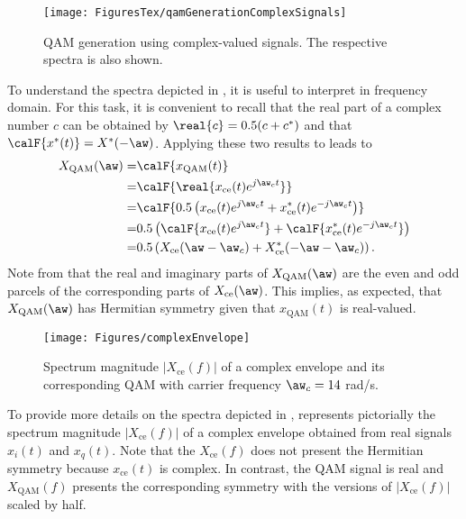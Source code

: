 \begin{figure}[htbp]
	\centering
		\texttt{[image: FiguresTex/qamGenerationComplexSignals]}		
	\caption{QAM generation using complex-valued signals. The respective spectra is also shown.\label{fig:qamGenerationComplexSignals}}
\end{figure}

To understand the spectra depicted in , it is useful to interpret  in frequency domain. For this task, it is convenient
to recall that the real part of a complex number $c$ can be obtained by $\real{c} = 0.5(c+c^*)$ and
that $\calF \{ x^*(t)\} = X^*(-\aw)$. Applying these two results to  leads to
\begin{align}
X_{\textrm{QAM}}(\aw) = & \calF \{ x_{\textrm{QAM}}(t) \}  \notag \\
 = & \calF \{ \real{ x_\textrm{ce}(t) e^{j \aw_c t} } \} \notag \\
= & \calF \{ 0.5 \left( x_\textrm{ce}(t) e^{j \aw_c t} + x_\textrm{ce}^*(t) e^{-j \aw_c t} \right)  \} \notag \\
= & 0.5 \left( \calF \{ x_\textrm{ce}(t) e^{j \aw_c t} \} + \calF \{ x_\textrm{ce}^*(t) e^{-j \aw_c 
t} \} \right) \notag \\
= & 0.5 \left( X_{\textrm{ce}}(\aw - \aw_c) +  X_{\textrm{ce}}^*(-\aw - \aw_c) \right).
\label{eq:qam_complex_in_freq_domain}
\end{align}
Note from  that the real and imaginary parts of $X_{\textrm{QAM}}(\aw)$ are the even and odd parcels of the corresponding parts of $X_{\textrm{ce}}(\aw)$. This implies, as expected,  that $X_{\textrm{QAM}}(\aw)$ has Hermitian symmetry given that 
$x_{\textrm{QAM}}(t)$ is real-valued.

\begin{figure}[htbp]
\centering
\texttt{[image: Figures/complexEnvelope]}
\caption{Spectrum magnitude $|X_\textrm{ce}(f)|$ of a complex envelope and its corresponding QAM with carrier frequency $\aw_c=14$ rad/s.\label{fig:complexEnvelope}}
\end{figure}

To provide more details on the spectra depicted in ,  represents pictorially the spectrum magnitude $|X_\textrm{ce}(f)|$ of a complex envelope obtained from real signals $x_i(t)$ and $x_q(t)$.
Note that the $X_\textrm{ce}(f)$ does not present the Hermitian symmetry because $x_\textrm{ce}(t)$ is complex. In contrast, the QAM signal is real and $X_\textrm{QAM}(f)$ presents the corresponding symmetry with the versions of $|X_\textrm{ce}(f)|$ scaled by half.

